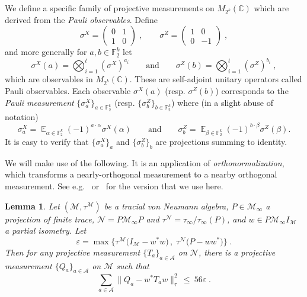 \documentclass[11pt]{article}
\newtheorem{lemma}[theorem]{Lemma}
\theoremstyle{definition}
\newcommand{\Id}{\ensuremath{I}}
\DeclareMathOperator*{\Expectation}{\mathbb{E}}
\newcommand{\Es}[1]{\Expectation_{#1}}
\newcommand{\C}{\ensuremath{\mathbb{C}}}
\newcommand{\F}{\ensuremath{\mathbb{F}}}
\newcommand{\mA}{\ensuremath{\mathcal{A}}}
\newcommand{\mM}{\ensuremath{\mathcal{M}}}
\newcommand{\eps}{\varepsilon}
\newcommand{\mN}{\mathcal{N}}
\begin{document}
	We define a specific family of projective measurements on $M_{2^k}(\C)$ which are derived from the \emph{Pauli observables}. Define
	\begin{equation}\label{eq:def-pauli-1} \sigma^X = \begin{pmatrix} 0 & 1 \\ 1 & 0 \end{pmatrix}\;,\qquad \sigma^Z = \begin{pmatrix} 1 & 0 \\ 0 & -1\end{pmatrix}\;,
	\end{equation}
	and more generally for $a,b\in \F_2^k$ let 
	\begin{equation}\label{eq:def-pauli-2}
	\sigma^X(a) = \bigotimes_{i=1}^t (\sigma^X)^{a_i}\qquad\text{and}\qquad\sigma^Z(b) = \bigotimes_{i=1}^t (\sigma^Z)^{b_i}\;,
	\end{equation}
	which are observables in $M_{2^k}(\C)$. These are self-adjoint unitary operators called Pauli observables. Each observable $\sigma^X(a)$ (resp. $\sigma^Z(b)$) corresponds to the \emph{Pauli measurement} $\{ \sigma^X_a \}_{a \in \F_2^k}$ (resp. $\{ \sigma^Z_b \}_{b \in \F_2^k}$) where (in a slight abuse of notation)  
	\[ \sigma^X_a = \Es{\alpha\in\F_2^k} (-1)^{a\cdot \alpha} \sigma^X(\alpha)\qquad\text{and}\qquad\sigma^Z_b = \Es{\beta\in\F_2^k} (-1)^{b\cdot\beta} \sigma^Z(\beta).\]
	It is easy to verify that $\{\sigma^X_a\}_a$ and $\{\sigma^Z_b\}_b$ are projections summing to identity.	
	
	
	We will make use of the following. It is an application of \emph{orthonormalization}, which transforms a nearly-orthogonal measurement to a nearby orthogonal measurement. See e.g.~\cite{kempe2011parallel,ji2020quantum} or~\cite[Theorem 1.2]{de2021orthogonalization} for the version that we use here. 
	
\begin{lemma}\label{lem:pull-back}
Let  $(\mM,\tau^\mM)$ be a tracial von Neumann algebra, $P\in\mM_\infty$ a projection of finite trace, $\mN=P\mM_\infty P$ and $\tau^\mN=\tau_\infty/\tau_\infty(P)$, and $w\in P \mM_\infty \Id_\mM$ a partial isometry.  Let 
\[ \eps = \max\big\{ \tau^\mM\big(\Id_\mM - w^* w\big)\,,\;\tau^\mN\big( P- w w^*\big)\big\}\;.\] 
 Then for any projective measurement $\{T_a\}_{a \in \mA}$ on $\mN$, there is a projective measurement $\{Q_a\}_{a \in \mA}$ on $\mM$ such that 
\begin{equation}
\label{eq:pull-back} \sum_{a \in \mA} \big\| Q_a - w^* T_a w\big\|_\tau^2 \,\leq \ 56\eps\;.
\end{equation}
\end{lemma}	
\end{document}
